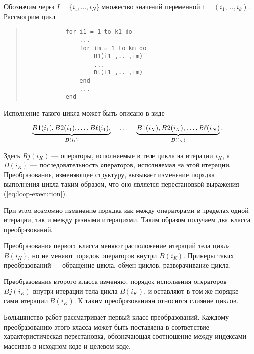 Обозначим через $I = \{i_1, \ldots, i_N \}$ множество значений переменной $i = (i_1, \ldots, i_k)$. Рассмотрим цикл

\begin{center}
	\begin{quote}
		\begin{verbatim}
            for i1 = 1 to k1 do
                ...
                for im = 1 to km do
                    B1(i1 ,...,im)
                    ...
                    Bl(i1 ,...,im)
                end
                ...
            end
		\end{verbatim}
	\end{quote}
\end{center}

Исполнение такого цикла может быть описано в виде

\begin{equation}\label{eq:loop-execution}
	\underbrace{B1(i_{1}), B2(i_{1}), \ldots, B\ell(i_{1}),}_{B(i_{1})} 
	\hspace{4mm} \ldots \hspace{4mm} 
	\underbrace{B1(i_{N}), B2(i_{N}), \ldots, B\ell(i_{N})}_{B(i_{N})}.
\end{equation}

Здесь $Bj(i_K)$ --- операторы, исполняемые в теле цикла на итерации $i_K$, а $B(i_K)$ --- последовательность операторов, исполняемая на этой итерации. Преобразование, изменяющее структуру, вызывает изменение порядка выполнения цикла таким образом, что оно является перестановкой выражения (\ref{eq:loop-execution}).

При этом возможно изменение порядка как между операторами в пределах одной итерации, так и между разными итерациями. Таким образом получаем два~класса преобразований.

Преобразования первого класса меняют расположение итераций тела цикла $B(i_K)$, но не меняют порядок операторов внутри $B(i_K)$. Примеры таких преобразований --- обращение цикла, обмен циклов, разворачивание цикла.

Преобразования второго класса изменяют порядок исполнения операторов $Bj(i_K)$ внутри итерации тела цикла $B(i_K)$, и оставляют в том же порядке сами итерации $B(i_K)$. К таким преобразованиям относится слияние циклов.

Большинство работ рассматривает первый класс преобразований. Каждому преобразованию этого класса может быть поставлена в соответствие характеристическая перестановка, обозначающая соотношение между индексами массивов в исходном коде и целевом коде.

